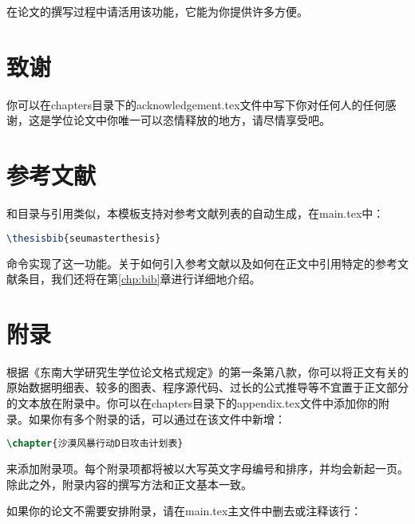\noindent 在论文的撰写过程中请活用该功能，它能为你提供许多方便。

\section{致谢}

你可以在chapters目录下的acknowledgement.tex文件中写下你对任何人的任何感谢，这是学位论文中你唯一可以恣情释放的地方，请尽情享受吧。

\section{参考文献}

和目录与引用类似，本模板支持对参考文献列表的自动生成，在main.tex中：

\begin{tcolorbox}
\begin{lstlisting}[language=TeX]
\thesisbib{seumasterthesis}
\end{lstlisting}
\end{tcolorbox}

\noindent 命令实现了这一功能。关于如何引入参考文献以及如何在正文中引用特定的参考文献条目，我们还将在第\ref{chp:bib}章进行详细地介绍。

\section{附录}

根据《东南大学研究生学位论文格式规定》\cite{seugs2015rule}的第一条第八款，你可以将正文有关的原始数据明细表、较多的图表、程序源代码、过长的公式推导等不宜置于正文部分的文本放在附录中。你可以在chapters目录下的appendix.tex文件中添加你的附录。如果你有多个附录的话，可以通过在该文件中新增：

\begin{tcolorbox}
\begin{lstlisting}[language=TeX]
\chapter{沙漠风暴行动D日攻击计划表}
\end{lstlisting}
\end{tcolorbox}

\noindent 来添加附录项。每个附录项都将被以大写英文字母编号和排序，并均会新起一页。除此之外，附录内容的撰写方法和正文基本一致。

如果你的论文不需要安排附录，请在main.tex主文件中删去或注释该行：

